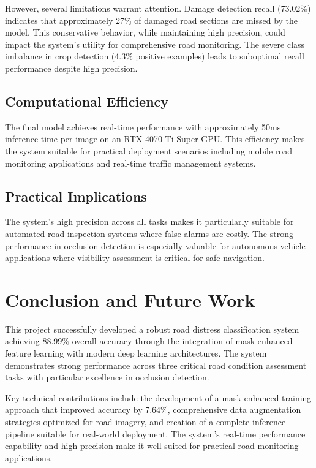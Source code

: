 \documentclass[12pt,twocolumn]{article}
\begin{document}
However, several limitations warrant attention. Damage detection recall (73.02\%) indicates that approximately 27\% of damaged road sections are missed by the model. This conservative behavior, while maintaining high precision, could impact the system's utility for comprehensive road monitoring. The severe class imbalance in crop detection (4.3\% positive examples) leads to suboptimal recall performance despite high precision.

\subsection{Computational Efficiency}

The final model achieves real-time performance with approximately 50ms inference time per image on an RTX 4070 Ti Super GPU. This efficiency makes the system suitable for practical deployment scenarios including mobile road monitoring applications and real-time traffic management systems.

\subsection{Practical Implications}

The system's high precision across all tasks makes it particularly suitable for automated road inspection systems where false alarms are costly. The strong performance in occlusion detection is especially valuable for autonomous vehicle applications where visibility assessment is critical for safe navigation.

\section{Conclusion and Future Work}

This project successfully developed a robust road distress classification system achieving 88.99\% overall accuracy through the integration of mask-enhanced feature learning with modern deep learning architectures. The system demonstrates strong performance across three critical road condition assessment tasks with particular excellence in occlusion detection.

Key technical contributions include the development of a mask-enhanced training approach that improved accuracy by 7.64\%, comprehensive data augmentation strategies optimized for road imagery, and creation of a complete inference pipeline suitable for real-world deployment. The system's real-time performance capability and high precision make it well-suited for practical road monitoring applications.
\end{document}
